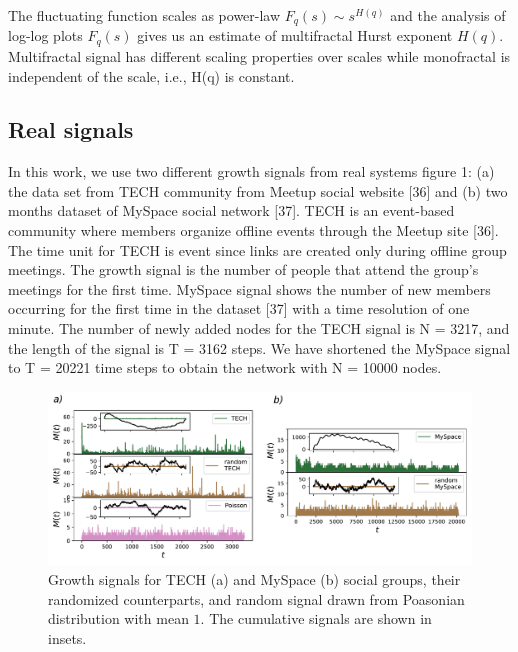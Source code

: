 The fluctuating function scales as power-law $F_q(s) \sim s^{H(q)}$ and the analysis of log-log plots $F_q(s)$ gives us an estimate of multifractal Hurst exponent $H(q)$. Multifractal signal has different scaling properties over scales while monofractal is independent of the scale, i.e., H(q) is constant. 

\subsection{Real signals}

In this work, we use two different growth signals from real systems figure 1: (a) the
data set from TECH community from Meetup social website [36] and (b) two months
dataset of MySpace social network [37]. TECH is an event-based community where
members organize offline events through the Meetup site [36]. The time unit for TECH
is event since links are created only during offline group meetings. The growth signal
is the number of people that attend the group’s meetings for the first time. MySpace
signal shows the number of new members occurring for the first time in the dataset [37]
with a time resolution of one minute. The number of newly added nodes for the TECH
signal is N = 3217, and the length of the signal is T = 3162 steps. We have shortened
the MySpace signal to T = 20221 time steps to obtain the network with N = 10000
nodes.
\begin{figure}[!ht]
	\centering
	\includegraphics[width=\linewidth]{Figures/signals.pdf}
	\caption{Growth signals for TECH (a) and MySpace (b) social groups, their randomized counterparts, and random signal drawn from Poasonian distribution with mean $1$. The cumulative signals are shown in insets.}
	\label{fig:signals}
\end{figure}

